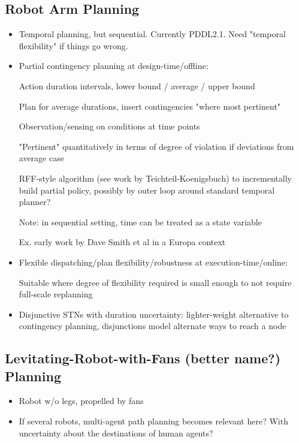 \subsection{Robot Arm Planning}

\begin{itemize}

\item Temporal planning, but sequential. Currently PDDL2.1. Need "temporal flexibility" if things go wrong.

\item Partial contingency planning at design-time/offline:

    Action duration intervals, lower bound / average / upper bound
    
    Plan for average durations, insert contingencies "where most pertinent"
    
    Observation/sensing on conditions at time points
    
    "Pertinent" quantitatively in terms of degree of violation if deviations from average case
    
    RFF-style algorithm (see work by Teichteil-Koenigsbuch) to incrementally build partial policy, possibly by outer loop around standard temporal planner?
    
    Note: in sequential setting, time can be treated as a state variable
    
    Ex. early work by Dave Smith et al in a Europa context

\item Flexible dispatching/plan flexibility/robustness at execution-time/online:

    Suitable where degree of flexibility required is small enough to not require full-scale replanning
    
\item Disjunctive STNs with duration uncertainty: lighter-weight alternative to contingency planning, disjunctions model alternate ways to reach a node
    
\end{itemize}







\subsection{Levitating-Robot-with-Fans (better name?) Planning}

\begin{itemize}

\item Robot w/o legs, propelled by fans
   
\item If several robots, multi-agent path planning becomes relevant here? With uncertainty about the destinations of human agents?
  
\end{itemize}
